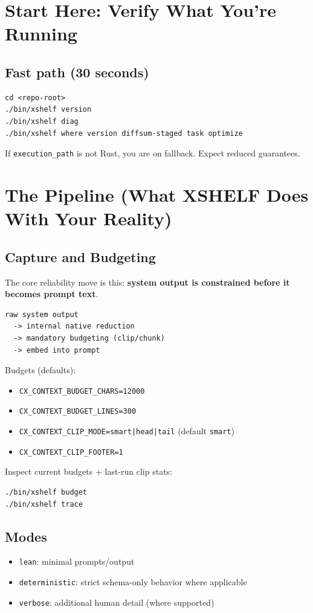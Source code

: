 \documentclass[11pt]{article}
\begin{document}
\tableofcontents
\newpage

\section{Start Here: Verify What You’re Running}
\subsection*{Fast path (30 seconds)}
\begin{lstlisting}[style=cx]
cd <repo-root>
./bin/xshelf version
./bin/xshelf diag
./bin/xshelf where version diffsum-staged task optimize
\end{lstlisting}

If \texttt{execution\_path} is not Rust, you are on fallback. Expect reduced guarantees.

\section{The Pipeline (What XSHELF Does With Your Reality)}
\subsection{Capture and Budgeting}
The core reliability move is this: \textbf{system output is constrained before it becomes prompt text}.

\begin{lstlisting}[style=cx]
raw system output
  -> internal native reduction
  -> mandatory budgeting (clip/chunk)
  -> embed into prompt
\end{lstlisting}

Budgets (defaults):
\begin{itemize}
  \item \texttt{CX\_CONTEXT\_BUDGET\_CHARS=12000}
  \item \texttt{CX\_CONTEXT\_BUDGET\_LINES=300}
  \item \texttt{CX\_CONTEXT\_CLIP\_MODE=smart|head|tail} (default \texttt{smart})
  \item \texttt{CX\_CONTEXT\_CLIP\_FOOTER=1}
\end{itemize}

Inspect current budgets + last-run clip stats:
\begin{lstlisting}[style=cx]
./bin/xshelf budget
./bin/xshelf trace
\end{lstlisting}

\subsection{Modes}
\begin{itemize}
  \item \texttt{lean}: minimal prompts/output
  \item \texttt{deterministic}: strict schema-only behavior where applicable
  \item \texttt{verbose}: additional human detail (where supported)
\end{itemize}
\end{document}

